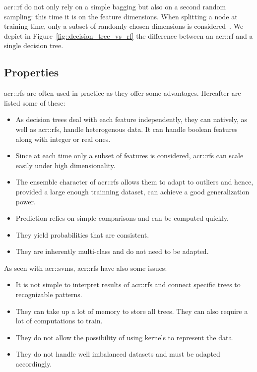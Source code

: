         \gls{acr::rf} do not only rely on a simple bagging but also on a second random sampling: this time it is on the feature dimensions.
        When splitting a node at training time, only a subset of randomly chosen dimensions is considered~\parencite{breiman2001random}.
        We depict in Figure~\ref{fig::decision_tree_vs_rf} the difference between an \gls{acr::rf} and a single decision tree.

    \subsection{Properties}
        \glspl{acr::rf} are often used in practice as they offer some advantages.
        Hereafter are listed some of these:
        \begin{itemize}
            \item As decision trees deal with each feature independently, they can natively, as well as \glspl{acr::rf}, handle heterogenous data.
                It can handle boolean features along with integer or real ones.
            \item Since at each time only a subset of features is considered, \glspl{acr::rf} can scale easily under high dimensionality.
            \item The ensemble character of \glspl{acr::rf} allows them to adapt to outliers and hence, provided a large enough trainning dataset, can achieve a good generalization power.
            \item Prediction relies on simple comparisons and can be computed quickly.
            \item They yield probabilities that are consistent.
            \item They are inherently multi-class and do not need to be adapted.
        \end{itemize}
        As seen with \glspl{acr::svm}, \glspl{acr::rf} have also some issues:
        \begin{itemize}
            \item It is not simple to interpret results of \glspl{acr::rf} and connect specific trees to recognizable patterns.
            \item They can take up a lot of memory to store all trees.
                    They can also require a lot of computations to train.
            \item They do not allow the possibility of using kernels to represent the data.
            \item They do not handle well imbalanced datasets and must be adapted accordingly.
        \end{itemize}

